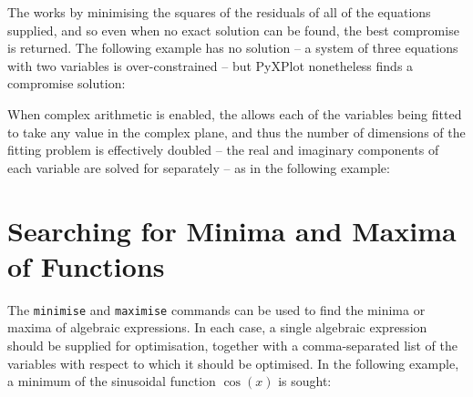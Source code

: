 The  works by minimising the squares of the residuals of all of the
equations supplied, and so even when no exact solution can be found, the best
compromise is returned. The following example has no solution -- a system of
three equations with two variables is over-constrained -- but PyXPlot
nonetheless finds a compromise solution:

\vspace{3mm}
\newline
{}\newline
{}\newline
{}\newline
{}
\vspace{3mm}

When complex arithmetic is enabled, the  allows each of the
variables being fitted to take any value in the complex plane, and thus the
number of dimensions of the fitting problem is effectively doubled -- the real
and imaginary components of each variable are solved for separately -- as in
the following example:

\vspace{3mm}
\newline
{}\newline
{}\newline
{}\newline
{}\newline
{}
\vspace{3mm}

\section{Searching for Minima and Maxima of Functions}

The  {\tt minimise} and {\tt maximise}
commands can be used to find the minima or maxima of algebraic expressions. In
each case, a single algebraic expression should be supplied for optimisation,
together with a comma-separated list of the variables with respect to which it
should be optimised. In the following example, a minimum of the sinusoidal
function $\cos(x)$ is sought:

